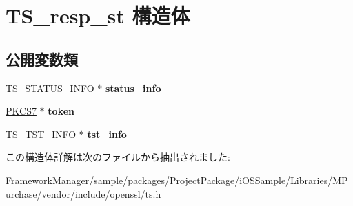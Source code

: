 \hypertarget{struct_t_s__resp__st}{}\section{T\+S\+\_\+resp\+\_\+st 構造体}
\label{struct_t_s__resp__st}
\subsection*{公開変数類}
\begin{DoxyCompactItemize}
\item 
\hypertarget{struct_t_s__resp__st_a9bd656baceb73a81e2cb3b41799c8dc0}{}\hyperlink{struct_t_s__status__info__st}{T\+S\+\_\+\+S\+T\+A\+T\+U\+S\+\_\+\+I\+N\+F\+O} $\ast$ {\bfseries status\+\_\+info}\label{struct_t_s__resp__st_a9bd656baceb73a81e2cb3b41799c8dc0}

\item 
\hypertarget{struct_t_s__resp__st_afaf455ead8fb6b4c236f8c6c28eb458d}{}\hyperlink{structpkcs7__st}{P\+K\+C\+S7} $\ast$ {\bfseries token}\label{struct_t_s__resp__st_afaf455ead8fb6b4c236f8c6c28eb458d}

\item 
\hypertarget{struct_t_s__resp__st_a79930775dd736e54ec3b762292e654e6}{}\hyperlink{struct_t_s__tst__info__st}{T\+S\+\_\+\+T\+S\+T\+\_\+\+I\+N\+F\+O} $\ast$ {\bfseries tst\+\_\+info}\label{struct_t_s__resp__st_a79930775dd736e54ec3b762292e654e6}

\end{DoxyCompactItemize}


この構造体詳解は次のファイルから抽出されました\+:\begin{DoxyCompactItemize}
\item 
Framework\+Manager/sample/packages/\+Project\+Package/i\+O\+S\+Sample/\+Libraries/\+M\+Purchase/vendor/include/openssl/ts.\+h\end{DoxyCompactItemize}
